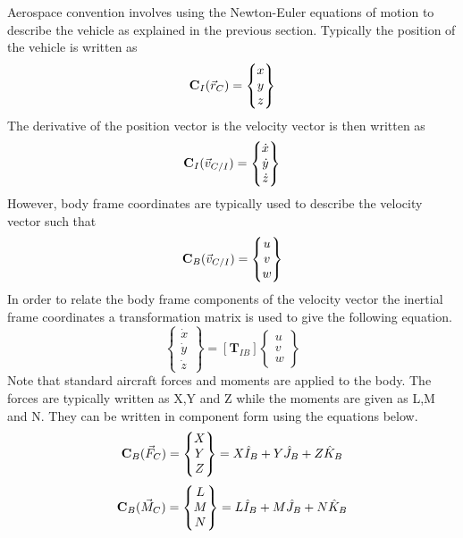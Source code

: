 \documentclass{article}
\begin{document}
Aerospace convention involves using the Newton-Euler equations of
motion to describe the vehicle\cite{etkins} as explained in the
previous section. Typically the position of the
vehicle is written as 
\begin{equation}
{\bf C}_I(\vec{r}_C) = \begin{Bmatrix} x \\ y \\ z \end{Bmatrix}
\end{equation}
The derivative of the position vector is the velocity vector is then
written as
\begin{equation}
{\bf C}_I(\vec{v}_{C/I}) = \begin{Bmatrix} \dot{x} \\ \dot{y} \\ \dot{z} \end{Bmatrix}
\end{equation}
However, body frame coordinates are typically used to
describe the velocity vector such that
\begin{equation}
{\bf C}_B(\vec{v}_{C/I}) = \begin{Bmatrix} u \\ v \\ w \end{Bmatrix}
\end{equation}
In order to relate the body frame components of the velocity vector
the inertial frame coordinates a transformation matrix is used to give
the following equation.
\begin{equation}\label{e:xyzdot}
\begin{Bmatrix} \dot{x} \\ \dot{y} \\ \dot{z}   \end{Bmatrix} = [\textbf{T}_{IB}]
\begin{Bmatrix} u \\ v \\ w \end{Bmatrix}
\end{equation}
Note that standard aircraft forces and moments are applied to the
body. The forces are typically written as X,Y and Z while the moments
are given as L,M and N. They can be written in component form using
the equations below.
\begin{equation}
{\bf C}_B(\vec{F}_{C}) = \begin{Bmatrix} X \\ Y
  \\ Z \end{Bmatrix} = X \hat{I}_B + Y \hat{J}_B + Z \hat{K}_B
\end{equation}
\begin{equation}
{\bf C}_B(\vec{M}_{C}) = \begin{Bmatrix} L \\ M
  \\ N \end{Bmatrix} = L \hat{I}_B + M \hat{J}_B + N \hat{K}_B
\end{equation}
\end{document}
